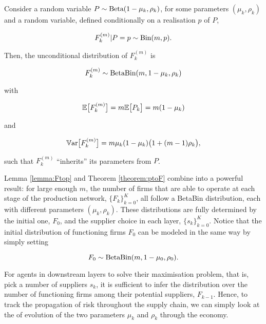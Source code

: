 \documentclass[../../main.tex]{subfiles}
\begin{document}
\begin{theorem} \label{theorem:ptoF}
  Consider a random variable $P \sim \text{Beta}(1 - \mu_k, \rho_k)$, for some parameters $(\mu_k, \rho_k)$ and a random variable, defined conditionally on a realisation $p$ of $P$, 
  
  \begin{equation}
    F^{(m)}_k \vert P = p \sim \text{Bin}(m, p).
  \end{equation}

  Then, the unconditional distribution of $F^{(m)}_k$ is 

  \begin{equation}
    F^{(m)}_k \sim \text{Beta}\text{Bin}(m, 1 - \mu_k, \rho_k)
  \end{equation}

  with

  \begin{equation} \label{eq:mean_of_F}
    \mathbb{E} \big[F^{(m)}_k\big] = m \mathbb{E} \big[P_k\big] = m (1 - \mu_k)
  \end{equation}

  and 

  \begin{equation} \label{eq:var_of_F}
    \mathbb{V}\text{ar} \big[F^{(m)}_k\big] = m \mu_k (1 - \mu_k) \big(1 + (m - 1) \rho_k\big),
  \end{equation}

  such that $F^{(m)}_k$ ``inherits'' its parameters from $P$.
\end{theorem}


Lemma \ref*{lemma:Ftop} and Theorem \ref*{theorem:ptoF} combine into a powerful result: for large enough $m$, the number of firms that are able to operate at each stage of the production network, $\{F_k\}^{K}_{k = 0}$, all follow a BetaBin distribution, each with different parameters $(\mu_k, \rho_k)$. These distributions are fully determined by the initial one, $F_0$, and the supplier choice in each layer, $\{s_k\}^{K}_{k = 0}$. Notice that the initial distribution of functioning firms $F_0$ can be modeled in the same way by simply setting 

\begin{equation}
  F_0 \sim \text{Beta}\text{Bin}(m, 1 - \mu_0, \rho_0).
\end{equation}


For agents in downstream layers to solve their maximisation problem, that is, pick a number of suppliers $s_k$, it is sufficient to infer the distribution over the number of functioning firms among their potential suppliers, $F_{k - 1}$. Hence, to track the propagation of risk throughout the supply chain, we can simply look at the of evolution of the two parameters $\mu_k$ and $\rho_k$ through the economy.
\end{document}
